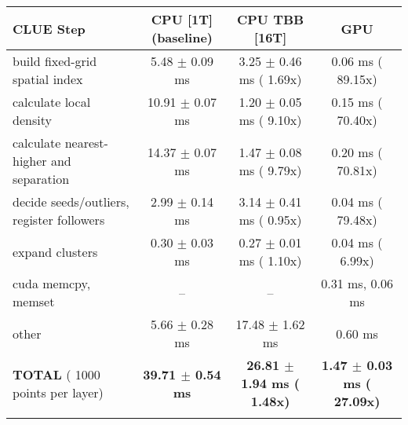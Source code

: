     \begin{tabular}{l|c|c|c}
    \hline
    CLUE Step                                 & CPU [1T] (baseline)         & CPU TBB [16T]                         & GPU                       \\ \hline
    build fixed-grid spatial index            &   5.48 $\pm$  0.09 ms       &   3.25 $\pm$  0.46 ms ( 1.69x)        &   0.06 ms ( 89.15x)       \\
    calculate local density                   &  10.91 $\pm$  0.07 ms       &   1.20 $\pm$  0.05 ms ( 9.10x)        &   0.15 ms ( 70.40x)       \\
    calculate nearest-higher and separation   &  14.37 $\pm$  0.07 ms       &   1.47 $\pm$  0.08 ms ( 9.79x)        &   0.20 ms ( 70.81x)       \\
    decide seeds/outliers, register followers &   2.99 $\pm$  0.14 ms       &   3.14 $\pm$  0.41 ms ( 0.95x)        &   0.04 ms ( 79.48x)       \\
    expand clusters                           &   0.30 $\pm$  0.03 ms       &   0.27 $\pm$  0.01 ms ( 1.10x)        &   0.04 ms (  6.99x)       \\ \hline
    cuda memcpy, memset                       & --                          & --                                    &   0.31 ms,   0.06 ms      \\ 
    other                                     &   5.66 $\pm$  0.28 ms       &  17.48 $\pm$  1.62 ms                 &   0.60 ms                 \\ \hline
    \textbf{TOTAL} ( 1000 points per layer)   & \textbf{ 39.71 $\pm$  0.54 ms} & \textbf{ 26.81 $\pm$  1.94 ms ( 1.48x)} & \textbf{  1.47 $\pm$  0.03 ms ( 27.09x)}  \\
    \hline
    \multicolumn{4}{c}{} 
    \end{tabular}
    \linebreak


